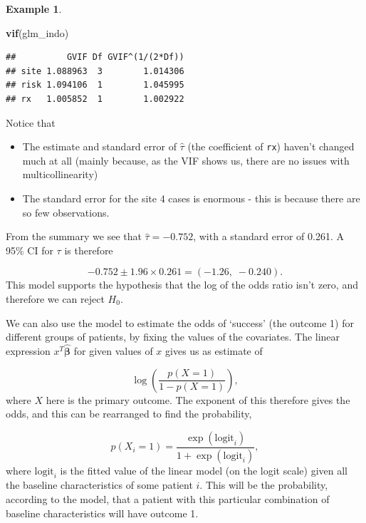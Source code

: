 \documentclass[
  openany]{book}
\newenvironment{Shaded}{\begin{snugshade}}{\end{snugshade}}
\newcommand{\FunctionTok}[1]{\textcolor[rgb]{0.13,0.29,0.53}{\textbf{#1}}}
\newcommand{\NormalTok}[1]{#1}
\providecommand{\tightlist}{%
  \setlength{\itemsep}{0pt}\setlength{\parskip}{0pt}}
\theoremstyle{definition}
\theoremstyle{definition}
\newtheorem{example}{Example}[chapter]
\theoremstyle{definition}
\theoremstyle{definition}
\theoremstyle{remark}
\begin{document}
\begin{example}
\begin{Shaded}
\begin{Highlighting}[]
\FunctionTok{vif}\NormalTok{(glm\_indo)}
\end{Highlighting}
\end{Shaded}

\begin{verbatim}
##          GVIF Df GVIF^(1/(2*Df))
## site 1.088963  3        1.014306
## risk 1.094106  1        1.045995
## rx   1.005852  1        1.002922
\end{verbatim}

Notice that

\begin{itemize}
\tightlist
\item
  The estimate and standard error of \(\hat{\tau}\) (the coefficient of \texttt{rx}) haven't changed much at all (mainly because, as the VIF shows us, there are no issues with multicollinearity)
\item
  The standard error for the site 4 cases is enormous - this is because there are so few observations.
\end{itemize}

From the summary we see that \(\hat\tau = -0.752\), with a standard error of 0.261. A 95\% CI for \(\tau\) is therefore

\[-0.752 \pm 1.96\times 0.261 = \left(-1.26,\;-0.240\right).\]
This model supports the hypothesis that the log of the odds ratio isn't zero, and therefore we can reject \(H_0\).
\end{example}

We can also use the model to estimate the odds of `success' (the outcome 1) for different groups of patients, by fixing the values of the covariates. The linear expression \(x^T\hat{\boldsymbol\beta}\) for given values of \(x\) gives us as estimate of

\[\log\left(\frac{p(X=1)}{1-p(X=1)}\right),\]
where \(X\) here is the primary outcome. The exponent of this therefore gives the odds, and this can be rearranged to find the probability,

\[p\left(X_i=1\right) = \frac{\exp(\text{logit}_i)}{1+\exp(\text{logit}_i)}, \]
where \(\text{logit}_i\) is the fitted value of the linear model (on the logit scale) given all the baseline characteristics of some patient \(i\).
This will be the probability, according to the model, that a patient with this particular combination of baseline characteristics will have outcome 1.
\end{document}
